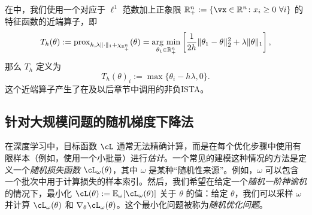 \documentclass[../../book-main.tex]{subfiles}
\begin{document}
\begin{example}\label{example:prox-of-nonnegative-l1}
    在中，我们使用一个对应于 \(\ell^{1}\) 范数加上正象限 \(\R_{+}^{n} := \{\vx \in \R^{n} \colon x_{i} \geq 0\ \forall i\}\) 的特征函数的近端算子，即
    \begin{equation}
        T_{h}(\theta) := \prox_{h, \lambda\norm{\cdot}_{1} + \chi_{\R_{+}^{n}}}(\theta) = \argmin_{\theta_{1} \in \R_{+}^{n}}\bs{\frac{1}{2h}\norm{\theta_{1} - \theta}_{2}^{2} + \lambda\norm{\theta}_{1}},
    \end{equation}
    那么 \(T_{h}\) 定义为
    \begin{equation}
        T_{h}(\theta)_{i} := \max\{\theta_{i} - h\lambda, 0\}.
    \end{equation}
    这个近端算子产生了在及以后章节中调用的非负ISTA。
\end{example}



\subsection{针对大规模问题的随机梯度下降法}


在深度学习中，目标函数 \(\cL\) 通常无法精确计算，而是在每个优化步骤中使用有限样本（例如，使用一个小批量）进行\textit{估计}。一个常见的建模这种情况的方法是定义一个\textit{随机损失函数} \(\cL_{\omega}(\theta)\)，其中 \(\omega\) 是某种“随机性来源”。例如，\(\omega\) 可以包含一个批次中用于计算损失的样本索引。然后，我们希望在给定一个\textit{随机一阶神谕机}的情况下，最小化 \(\cL(\theta) := \Ex_{\omega}[\cL_{\omega}(\theta)]\) 关于 \(\theta\) 的值：给定 \(\theta\)，我们可以采样 \(\omega\) 并计算 \(\cL_{\omega}(\theta)\) 和 \(\nabla_{\theta}\cL_{\omega}(\theta)\)。这个最小化问题被称为\textit{随机优化问题}。
\end{document}
